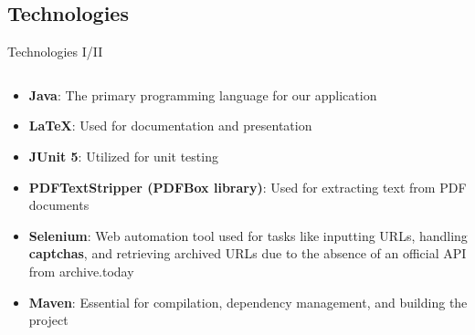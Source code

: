 \documentclass[
    ngerman,%
    authorontitle=true,
]{bfhbeamer}
\begin{document}
    \subsection{Technologies}
    \begin{frame}{Technologies I/II}
        \begin{columns}
            \begin{column}{0.7\textwidth}
                \begin{itemize}
                    \item \textbf{Java}: The primary programming language for our application
                    \item \textbf{LaTeX}: Used for documentation and presentation
                    \item \textbf{JUnit 5}: Utilized for unit testing
                    \item \textbf{PDFTextStripper (PDFBox library)}: Used for extracting text from PDF documents
                    \item \textbf{Selenium}: Web automation tool used for tasks like inputting URLs, handling \textbf{captchas}, and retrieving archived URLs due to the absence of an official API from archive.today
                    \item \textbf{Maven}: Essential for compilation, dependency management, and building the project
                \end{itemize}

            \end{column}


\end{columns}
\end{frame}
\end{document}
